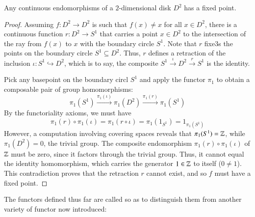 \begin{theorem}
    Any continuous endomorphisms of a $2$-dimensional disk $D^2$ has a fixed point.
\end{theorem}
\begin{proof}
    Assuming $f:D^2\rightarrow D^2$ is such that $f(x) \neq x$ for all $x \in D^2$, there is a continuous function $r:D^2\rightarrow S^1$ that carries a point $x \in D^2$ to the intersection of the ray from $f(x)$ to $x$ with the boundary circle $S^1$. Note that $r$ fixe3s the points on the boundary circle $S^1\subseteq D^2$. Thus, $r$ defines a retraction of the inclusion $\iota:S^1\hookrightarrow D^2$, which is to say, the composite $S^1\xrightarrow{\iota} D^2\xrightarrow{r}S^1$ is the identity. 

    Pick any basepoint on the boundary circl $S^1$ and apply the functor $\pi_1$ to obtain a composable pair of group homomorphisms: \begin{equation*}
        \pi_1(S^1)\xrightarrow{\pi_1(\iota)}\pi_1(D^2)\xrightarrow{\pi_1(r)}\pi_1(S^1)
    \end{equation*}
    By the functoriality axioms, we must have $$\pi_1(r)\circ\pi_1(\iota) = \pi_1(r\circ\iota) = \pi_1(1_{S^1}) = 1_{\pi_1(S^1)}$$
    However, a computation involving covering spaces reveals that $\pi_1(S^1) = \mathbb Z$, while $\pi_1(D^2) = 0$, the trivial group. The composite endomorphism $\pi_1(r)\circ \pi_1(\iota)$ of $\mathbb Z$ must be zero, since it factors through the trivial group. Thus, it cannot equal the identity homomorphism, which carries the generator $1 \in \mathbb Z$ to itself ($0 \neq 1$). This contradiction proves that the retraction $r$ cannot exist, and so $f$ must have a fixed point.
\end{proof}


The functors defined thus far are called  so as to distinguish them from another variety of functor now introduced: 

